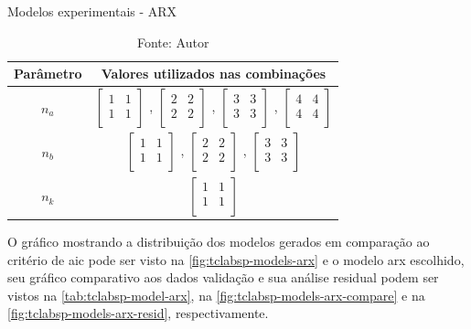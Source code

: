 \begin{table}[h]
	\centering
	\caption{Modelos experimentais - ARX}
	\label{tab:tclabsp-models-arx}
	\begin{tabular}{c|c} \toprule
		{Parâmetro}		&	{Valores utilizados nas combinações}									\\ \midrule
		$n_a$			&
							$ \begin{bmatrix}	1	&	1	\\	1	&	1	\\	\end{bmatrix} $	,		
							$ \begin{bmatrix}	2	&	2	\\	2	&	2	\\	\end{bmatrix} $	,		
							$ \begin{bmatrix}	3	&	3	\\	3	&	3	\\	\end{bmatrix} $	,		
							$ \begin{bmatrix}	4	&	4	\\	4	&	4	\\	\end{bmatrix} $		\\ \midrule
		$n_b$			&
							$ \begin{bmatrix}	1	&	1	\\	1	&	1	\\	\end{bmatrix} $	,		
							$ \begin{bmatrix}	2	&	2	\\	2	&	2	\\	\end{bmatrix} $	,		
							$ \begin{bmatrix}	3	&	3	\\	3	&	3	\\	\end{bmatrix} $	 	\\ \midrule
		$n_k$			&
							$ \begin{bmatrix}	1	&	1	\\	1	&	1	\\	\end{bmatrix} $		\\ \bottomrule
	\end{tabular}
	\caption*{Fonte: Autor}
\end{table}

O gráfico mostrando a distribuição dos modelos gerados em comparação ao critério de \acrshort{aic} pode ser
visto na \cref{fig:tclabsp-models-arx} e o modelo \acrshort{arx} escolhido, seu gráfico comparativo aos dados validação
e sua análise residual podem ser vistos na \cref{tab:tclabsp-model-arx}, na \cref{fig:tclabsp-models-arx-compare} e na
\cref{fig:tclabsp-models-arx-resid}, respectivamente.

